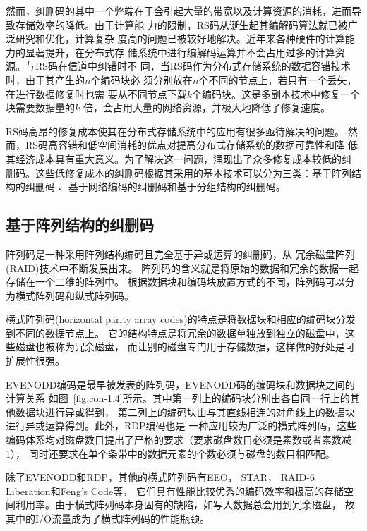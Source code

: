 然而，纠删码的其中一个弊端在于会引起大量的带宽以及计算资源的消耗，进而导致存储效率的降低。由于计算能
力的限制，RS码从诞生起其编解码算法就已被广泛研究和优化，计算复杂
度高的问题已被较好地解决。近年来各种硬件的计算能力的显著提升，在分布式存
储系统中进行编解码运算并不会占用过多的计算资源。与RS码在信道中纠错时不
同，当RS码作为分布式存储系统的数据容错技术时，由于其产生的$n$个编码块必
须分别放在$n$个不同的节点上，若只有一个丢失，在进行数据修复时也需
要从不同节点下载$k$个编码块。这是多副本技术中修复一个块需要数据量的$k$
倍，会占用大量的网络资源，并极大地降低了修复速度。

RS码高昂的修复成本使其在分布式存储系统中的应用有很多亟待解决的问题。
然而，RS码高容错和低空间消耗的优点对提高分布式存储系统的数据可靠性和降
低其经济成本具有重大意义。为了解决这一问题，涌现出了众多修复成本较低的纠
删码。这些低修复成本的纠删码根据其采用的基本技术可以分为三类：基于阵列结构的纠删码
、基于网络编码的纠删码和基于分组结构的纠删码。

\subsection{基于阵列结构的纠删码}
阵列码是一种采用阵列结构编码且完全基于异或运算的纠删码，从
冗余磁盘阵列(RAID)\cite{patterson1988case}技术中不断发展出来。
阵列码的含义就是将原始的数据和冗余的数据一起存储在一个二维的阵列中。
根据数据块和编码块放置方式的不同，阵列码可以分为横式阵列码和纵式阵列码。

横式阵列码(horizontal parity array codes)的特点是将数据块和相应的编码块分发到不同的数据节点上。
它的结构特点是将冗余的数据单独放到独立的磁盘中，这些磁盘也被称为冗余磁盘，
而让别的磁盘专门用于存储数据，这样做的好处是可扩展性很强。


EVENODD编码\cite{blaum1995evenodd}是最早被发表的阵列码，EVENODD码的编码块和数据块之间的计算关系
如图~\ref{fig:con-1.4}所示。其中第一列上的编码块分别由各自同一行上的其他数据块进行异或得到，
第二列上的编码块由与其直线相连的对角线上的数据块进行异或运算得到。此外，RDP\cite{corbett2004row}编码也是
一种应用较为广泛的横式阵列码，这些编码体系均对磁盘数目提出了严格的要求（要求磁盘数目必须是素数或者素数减1），
同时还要求在单个条带中的数据元素的个数必须与磁盘的数目相匹配。

除了EVENODD和RDP，其他的横式阵列码有EEO\cite{feng2010eeo}，
STAR\cite{huang2008star}，
RAID-6 Liberation\cite{plank2009raid}和Feng's Code\cite{feng2005new}等，
它们具有性能比较优秀的编码效率和极高的存储空间利用率。由于横式阵列码本身固有的缺陷，如写入数据总会用到冗余磁盘，
故其中的I/O流量成为了横式阵列码的性能瓶颈。


